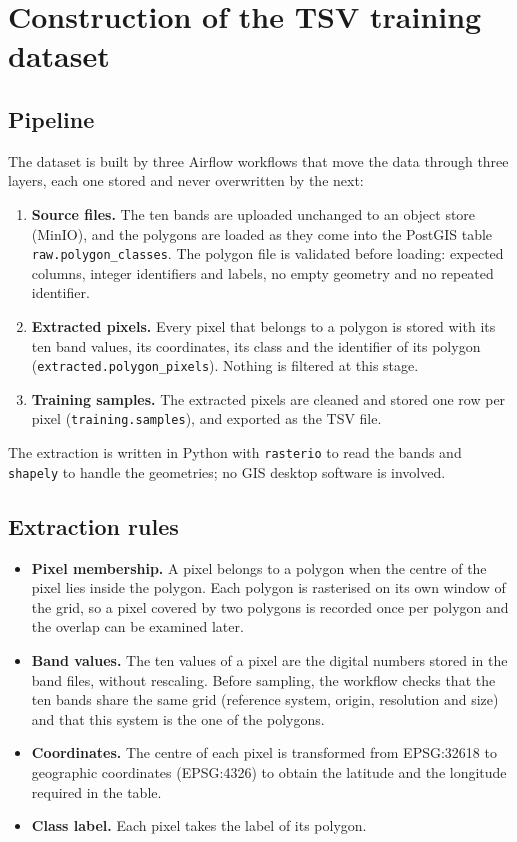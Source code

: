 \documentclass[11pt,a4paper]{article}
\begin{document}
\section{Construction of the TSV training dataset}

\subsection{Pipeline}

The dataset is built by three Airflow workflows that move the data through
three layers, each one stored and never overwritten by the next:

\begin{enumerate}
  \item \textbf{Source files.} The ten bands are uploaded unchanged to an
  object store (MinIO), and the polygons are loaded as they come into the
  PostGIS table \texttt{raw.polygon\_classes}. The polygon file is validated before
  loading: expected columns, integer identifiers and labels, no empty
  geometry and no repeated identifier.
  \item \textbf{Extracted pixels.} Every pixel that belongs to a polygon is
  stored with its ten band values, its coordinates, its class and the
  identifier of its polygon (\texttt{extracted.polygon\_pixels}). Nothing is
  filtered at this stage.
  \item \textbf{Training samples.} The extracted pixels are cleaned and stored
  one row per pixel (\texttt{training.samples}), and exported as the TSV file.
\end{enumerate}

The extraction is written in Python with \texttt{rasterio} to read the bands
and \texttt{shapely} to handle the geometries; no GIS desktop software is
involved.

\subsection{Extraction rules}

\begin{itemize}
  \item \textbf{Pixel membership.} A pixel belongs to a polygon when the centre
  of the pixel lies inside the polygon. Each polygon is rasterised on its own
  window of the grid, so a pixel covered by two polygons is recorded once per
  polygon and the overlap can be examined later.
  \item \textbf{Band values.} The ten values of a pixel are the digital numbers
  stored in the band files, without rescaling. Before sampling, the workflow
  checks that the ten bands share the same grid (reference system, origin,
  resolution and size) and that this system is the one of the polygons.
  \item \textbf{Coordinates.} The centre of each pixel is transformed from
  EPSG:32618 to geographic coordinates (EPSG:4326) to obtain the latitude and
  the longitude required in the table.
  \item \textbf{Class label.} Each pixel takes the label of its polygon.
\end{itemize}
\end{document}
